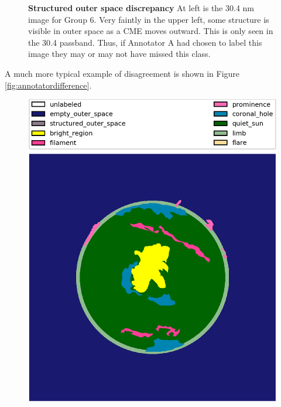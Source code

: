 \documentclass[twoside]{report}
\begin{document}
\begin{figure}[ht]
\begin{center}
    \caption{{\bf Structured outer space discrepancy} At left is the 30.4 nm image for Group 6. Very faintly in the upper left, some structure is visible in outer space as a CME moves outward. This is only seen in the 30.4 passband. Thus, if Annotator A had chosen to label this image they may or may not have missed this class.} 
    \label{fig:sos}
 \end{center}
\end{figure}

A much more typical example of disagreement is shown in Figure \ref{fig:annotatordifference}. 
\begin{figure}[ht]
  \begin{center}
  	\includegraphics[scale=0.1]{g20170415000148-a}

\end{center}
\end{figure}
\end{document}
